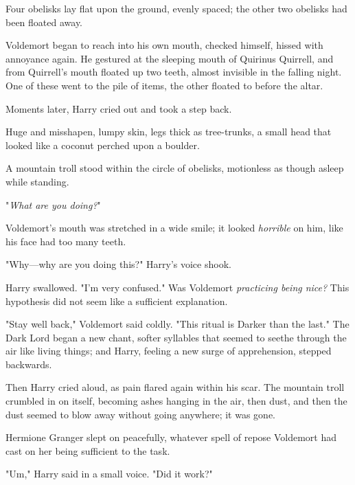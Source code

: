 Four obelisks lay flat upon the ground, evenly spaced; the other two obelisks
had been floated away.

Voldemort began to reach into his own mouth, checked himself, hissed with
annoyance again. He gestured at the sleeping mouth of Quirinus Quirrell, and
from Quirrell's mouth floated up two teeth, almost invisible in the falling
night. One of these went to the pile of items, the other floated to before the
altar.

Moments later, Harry cried out and took a step back.

Huge and misshapen, lumpy skin, legs thick as tree-trunks, a small head that
looked like a coconut perched upon a boulder.

A mountain troll stood within the circle of obelisks, motionless as though
asleep while standing.

"\emph{What are you doing?}"

Voldemort's mouth was stretched in a wide smile; it looked \emph{horrible} on
him, like his face had too many teeth. 

"Why---why are you doing this?" Harry's voice shook.


Harry swallowed. "I'm very confused." Was Voldemort \emph{practicing being
nice?} This hypothesis did not seem like a sufficient explanation.

"Stay well back," Voldemort said coldly. "This ritual is Darker than the last."
The Dark Lord began a new chant, softer syllables that seemed to seethe through
the air like living things; and Harry, feeling a new surge of apprehension,
stepped backwards.

Then Harry cried aloud, as pain flared again within his scar. The mountain
troll crumbled in on itself, becoming ashes hanging in the air, then dust, and
then the dust seemed to blow away without going anywhere; it was gone.

Hermione Granger slept on peacefully, whatever spell of repose Voldemort had
cast on her being sufficient to the task.

"Um," Harry said in a small voice. "Did it work?"

